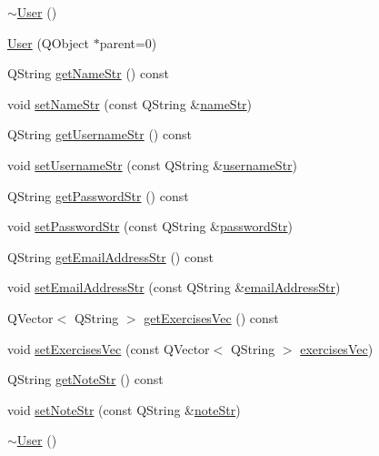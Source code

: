 \begin{DoxyCompactItemize}
\item 
\hyperlink{class_user_ac00b72ad64eb4149f7b21b9f5468c2b2}{$\sim$\-User} ()
\item 
\hyperlink{class_user_aec8c695d31d05b72e1fe0fc186ca3e2f}{User} (Q\-Object $\ast$parent=0)
\item 
Q\-String \hyperlink{class_user_a65e50684b26a7e8d427c3b67a5781f6f}{get\-Name\-Str} () const 
\item 
void \hyperlink{class_user_a4b9beeda4b5b86d7e76273d3532cfa99}{set\-Name\-Str} (const Q\-String \&\hyperlink{class_user_aca80d105a91d9bf8e04fccb4aed742af}{name\-Str})
\item 
Q\-String \hyperlink{class_user_acf682e97742a9d8a1503cf868bdcaebc}{get\-Username\-Str} () const 
\item 
void \hyperlink{class_user_a760015fe2cbd7c12f37ab50aca6761db}{set\-Username\-Str} (const Q\-String \&\hyperlink{class_user_aa05f77ad89b778912aa5c0d87ddf532a}{username\-Str})
\item 
Q\-String \hyperlink{class_user_addd43fc6cdb7bd40318d00af89201add}{get\-Password\-Str} () const 
\item 
void \hyperlink{class_user_aef12dc22c24d21321531e7f4af739171}{set\-Password\-Str} (const Q\-String \&\hyperlink{class_user_af5db2defeb3591fe79226d3fcf7393e7}{password\-Str})
\item 
Q\-String \hyperlink{class_user_affad94438dc558c9c39cfb92882b4a8d}{get\-Email\-Address\-Str} () const 
\item 
void \hyperlink{class_user_aac4f2f5e186b0643fcc1eadfd2d2deaa}{set\-Email\-Address\-Str} (const Q\-String \&\hyperlink{class_user_ac061140cfc7876f2a7433af74ac0cbab}{email\-Address\-Str})
\item 
Q\-Vector$<$ Q\-String $>$ \hyperlink{class_user_ad535f61489bf6a5c9e46ebdbd1f67ada}{get\-Exercises\-Vec} () const 
\item 
void \hyperlink{class_user_a1ab99995af208a4c3e438cfda1b0f671}{set\-Exercises\-Vec} (const Q\-Vector$<$ Q\-String $>$ \hyperlink{class_user_ab57f1403a6cb697291cd8bc77c94918a}{exercises\-Vec})
\item 
Q\-String \hyperlink{class_user_a90912ac4c78ca41ab6e02f55edee0fcf}{get\-Note\-Str} () const 
\item 
void \hyperlink{class_user_acf38efd49a7f4e918240dba4bd40966e}{set\-Note\-Str} (const Q\-String \&\hyperlink{class_user_a94d574465f1be71d870dbf716ca4ffe1}{note\-Str})
\item 
\hyperlink{class_user_ac00b72ad64eb4149f7b21b9f5468c2b2}{$\sim$\-User} ()
\end{DoxyCompactItemize}
